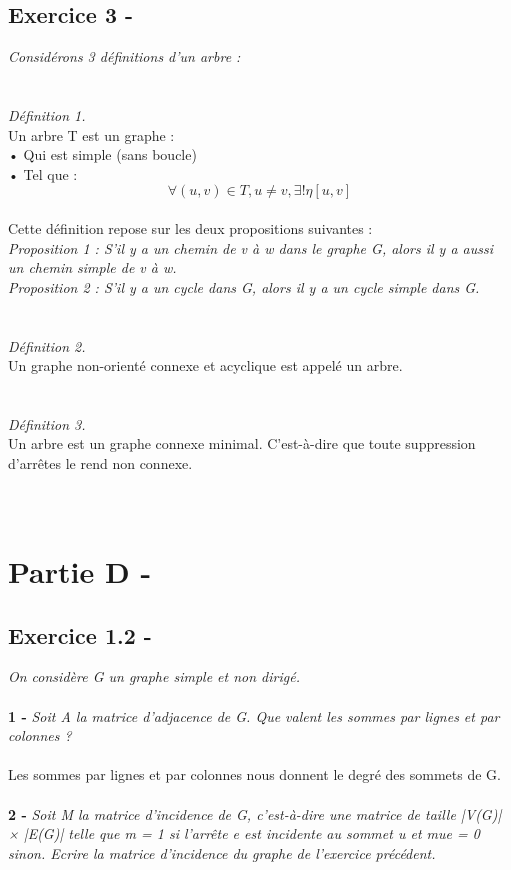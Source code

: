 \documentclass{article}
\begin{document}
\subsection*{Exercice 3 -}
\textit{Considérons 3 définitions d'un arbre : }\\\\\\

\textit{Définition 1.}\\
\textsf{Un arbre T est un graphe :}\\
\textsf{• Qui est simple (sans boucle)}\\
\textsf{• Tel que : }\\
\begin{equation}
\forall (u,v) \in T, u \neq v, \exists! \eta[u,v]
\end{equation}\\
\textsf{Cette définition repose sur les deux propositions suivantes :}\\
\textit{Proposition 1 : S'il y a un chemin de v à w dans le graphe G, alors il y a aussi un chemin simple de v à w.}\\
\textit{Proposition 2 : S'il y a un cycle dans G, alors il y a un cycle simple dans G.}\\\\\\

\textit{Définition 2.}\\
\textsf{Un graphe non-orienté connexe et acyclique est appelé un arbre.}\\\\\\

\textit{Définition 3.}\\
\textsf{Un arbre est un graphe connexe minimal. C'est-à-dire que toute suppression d'arrêtes le rend non connexe.}\\\\\\

\section*{Partie D -}
\subsection*{Exercice 1.2 -}
\textit{On considère G un graphe simple et non dirigé.}\\\\
\textbf{1 -}
\textit{Soit A la matrice d'adjacence de G. Que valent les sommes par lignes et par colonnes ?}\\\\
\textsf{Les sommes par lignes et par colonnes nous donnent le degré des sommets de G.}\\\\
\textbf{2 -}
\textit{Soit M la matrice d’incidence de G, c’est-à-dire une matrice de taille |V(G)| × |E(G)| telle que m = 1 si l’arrête e est incidente au sommet u et mue = 0 sinon. Ecrire la matrice d’incidence du graphe de l’exercice précédent.}
\end{document}
